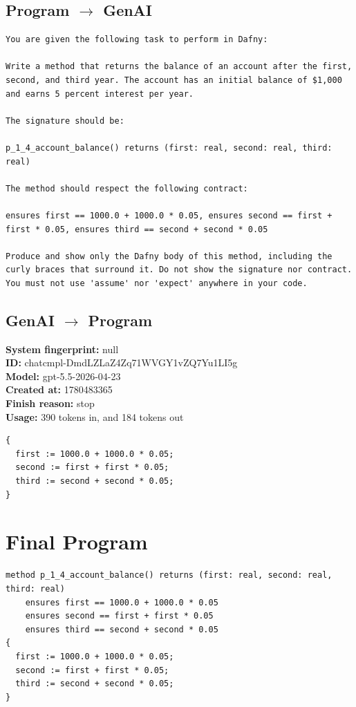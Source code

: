 \documentclass{article}
\begin{document}
\subsection*{Program $\rightarrow$ GenAI}
\begin{lstlisting}
You are given the following task to perform in Dafny:

Write a method that returns the balance of an account after the first, second, and third year. The account has an initial balance of $1,000 and earns 5 percent interest per year.

The signature should be:

p_1_4_account_balance() returns (first: real, second: real, third: real)

The method should respect the following contract:

ensures first == 1000.0 + 1000.0 * 0.05, ensures second == first + first * 0.05, ensures third == second + second * 0.05

Produce and show only the Dafny body of this method, including the curly braces that surround it. Do not show the signature nor contract. You must not use 'assume' nor 'expect' anywhere in your code.
\end{lstlisting}
\subsection*{GenAI $\rightarrow$ Program}
\textbf{System fingerprint: }null
\\\textbf{ID: }chatcmpl-DmdLZLaZ4Zq71WVGY1vZQ7Yu1LI5g
\\\textbf{Model: }gpt-5.5-2026-04-23
\\\textbf{Created at: }1780483365
\\\textbf{Finish reason: }stop
\\\textbf{Usage: }390 tokens in, and 184 tokens out
\begin{lstlisting}
{
  first := 1000.0 + 1000.0 * 0.05;
  second := first + first * 0.05;
  third := second + second * 0.05;
}
\end{lstlisting}
\section*{Final Program}
\begin{lstlisting}
method p_1_4_account_balance() returns (first: real, second: real, third: real)
	ensures first == 1000.0 + 1000.0 * 0.05
	ensures second == first + first * 0.05
	ensures third == second + second * 0.05
{
  first := 1000.0 + 1000.0 * 0.05;
  second := first + first * 0.05;
  third := second + second * 0.05;
}
\end{lstlisting}
\end{document}
